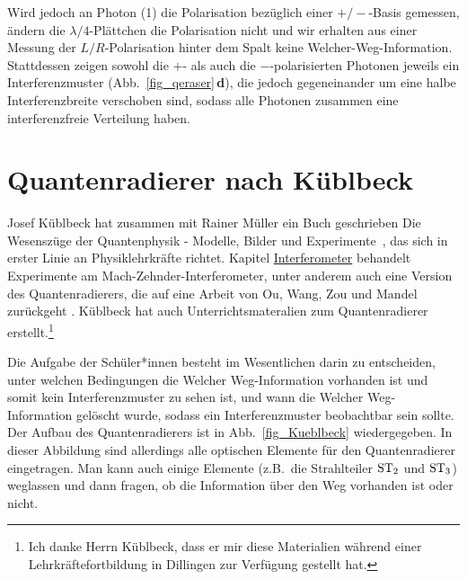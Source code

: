 Wird jedoch an Photon (1) die Polarisation 
bez\"uglich einer $+/-$-Basis gemessen,
\"andern die $\lambda/4$-Pl\"attchen die
Polarisation nicht und wir erhalten aus einer
Messung der $L/R$-Polarisation hinter dem
Spalt keine \glq Welcher-Weg\grq-Information.
Stattdessen zeigen sowohl die $+$- als auch
die $-$-polarisierten Photonen jeweils ein
Interferenzmuster (Abb.\ \ref{fig_qeraser}\,\textbf{d}),
die jedoch gegeneinander um eine
halbe Interferenzbreite verschoben sind,
sodass alle Photonen zusammen
eine interferenzfreie Verteilung haben.
 
\section{Quantenradierer nach K\"ublbeck}

Josef K\"ublbeck hat zusammen mit Rainer M\"uller ein Buch geschrieben \glqq Die Wesensz\"uge
der Quantenphysik - Modelle, Bilder und Experimente\grqq\ \cite{Kueblbeck}, das sich in erster
Linie an Physiklehrkr\"afte richtet. Kapitel \hyperref[chap_Interferometer]{Interferometer} 
behandelt Experimente am Mach-Zehnder-Interferometer,
unter anderem auch eine Version des Quantenradierers, die auf eine Arbeit von
Ou, Wang, Zou und Mandel zur\"uckgeht \cite{Ou}. K\"ublbeck hat auch Unterrichtsmateralien zum
Quantenradierer erstellt.\footnote{Ich danke Herrn K\"ublbeck, dass er mir diese Materialien
w\"ahrend einer Lehrkr\"aftefortbildung in Dillingen zur Verf\"ugung gestellt hat.}

Die Aufgabe der Sch\"uler*innen besteht im Wesentlichen darin zu entscheiden, unter welchen
Bedingungen die \glqq Welcher Weg\grqq-Information vorhanden ist und somit kein Interferenzmuster
zu sehen ist, und wann die \glqq Welcher Weg\grqq-Information gel\"oscht wurde, sodass ein
Interferenzmuster beobachtbar sein sollte. Der Aufbau des Quantenradierers ist in Abb.\ \ref{fig_Kueblbeck}
wiedergegeben. In dieser Abbildung sind allerdings alle optischen Elemente f\"ur den Quantenradierer
eingetragen. Man kann auch einige Elemente (z.B.\ die Strahlteiler ${\rm ST}_2$ und ${\rm ST}_3$)
weglassen und dann fragen, ob die Information \"uber den Weg vorhanden ist oder nicht. 

